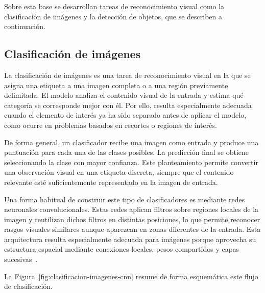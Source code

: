 Sobre esta base se desarrollan tareas de reconocimiento visual como la clasificación de imágenes y la detección de objetos, que se describen a continuación.


\subsection{Clasificación de imágenes}

La clasificación de imágenes es una tarea de reconocimiento visual en la que se asigna una etiqueta a una imagen completa o a una región previamente delimitada. El modelo analiza el contenido visual de la entrada y estima qué categoría se corresponde mejor con él. Por ello, resulta especialmente adecuada cuando el elemento de interés ya ha sido separado antes de aplicar el modelo, como ocurre en problemas basados en recortes o regiones de interés.


De forma general, un clasificador recibe una imagen como entrada y produce una puntuación para cada una de las clases posibles. La predicción final se obtiene seleccionando la clase con mayor confianza. Este planteamiento permite convertir una observación visual en una etiqueta discreta, siempre que el contenido relevante esté suficientemente representado en la imagen de entrada.

Una forma habitual de construir este tipo de clasificadores es mediante redes neuronales convolucionales. Estas redes aplican filtros sobre regiones locales de la imagen y reutilizan dichos filtros en distintas posiciones, lo que permite reconocer rasgos visuales similares aunque aparezcan en zonas diferentes de la entrada. Esta arquitectura resulta especialmente adecuada para imágenes porque aprovecha su estructura espacial mediante conexiones locales, pesos compartidos y capas sucesivas~\cite{lecun2015deepLearning}. 

La Figura~\ref{fig:clasificacion-imagenes-cnn} resume de forma esquemática este flujo de clasificación.

